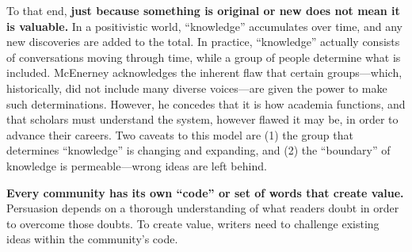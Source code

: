 To that end, \textbf{just because something is original or new does not mean it is valuable.}
In a positivistic world, ``knowledge'' accumulates over time, and any new discoveries are added to the total.
In practice, ``knowledge'' actually consists of conversations moving through time, while a group of people determine what is included.
McEnerney acknowledges the inherent flaw that certain groups---which, historically, did not include many diverse voices---are given the power to make such determinations.
However, he concedes that it is how academia functions, and that scholars must understand the system, however flawed it may be, in order to advance their careers.
Two caveats to this model are (1) the group that determines ``knowledge'' is changing and expanding, and (2) the ``boundary'' of knowledge is permeable---wrong ideas are left behind.

\textbf{Every community has its own ``code'' or set of words that create value.}
Persuasion depends on a thorough understanding of what readers doubt in order to overcome those doubts.
To create value, writers need to challenge existing ideas within the community's code.
